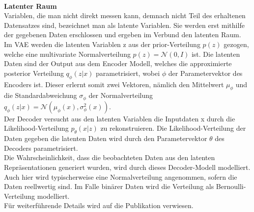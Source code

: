 \documentclass[%
thesis=student,%
coverpage=false,%
titlepage=false,%
headmarks=true, %
german,%
font=libertine, %
math=newpxtx, %
BCOR=5mm,%
coverBCOR=11mm%
]{tumbook}
\theoremstyle{break}
\begin{document}
\\
\textbf{Latenter Raum}\\
Variablen, die man nicht direkt messen kann, demnach nicht Teil des erhaltenen Datensatzes sind, bezeichnet man als latente Variablen. Sie werden erst mithilfe der gegebenen Daten erschlossen und ergeben im Verbund den latenten Raum.\\
Im VAE werden die latenten Variablen z aus der prior-Verteilung $p(z)$ gezogen, welche eine multivariate Normalverteilung $p(z) = \mathcal{N}(0,I) $ ist. Die latenten Daten sind der Output aus dem Encoder Modell, welches die  approximierte posterior Verteilung $q_\phi(z|x)$ parametrisiert, wobei $\phi$ der Parametervektor des Encoders ist. Dieser erlernt somit zwei Vektoren, nämlich den Mittelwert \( \mu_\phi \) und die Standardabweichung \( \sigma_\phi \) der Normalverteilung $q_\phi(z|x) = \mathcal{N}(\mu_\phi(x),\sigma_\phi^2(x))$.\\
Der Decoder versucht aus den latenten Variablen die Inputdaten x durch die Likelihood-Verteilung $p_\theta(x|z)$  zu rekonstruieren. Die Likelihood-Verteilung der Daten gegeben die latenten Daten wird durch den Parametervektor $\theta$ des Decoders parametrisiert.\\
Die  Wahrscheinlichkeit, dass die beobachteten Daten aus den latenten Repräsentationen generiert wurden, wird durch dieses Decoder-Modell modelliert. Auch hier wird typischerweise eine Normalverteilung angenommen, sofern die  Daten reellwertig sind. Im Falle binärer Daten wird die Verteilung als Bernoulli-Verteilung modelliert. \\ Für weiterführende Details wird auf die Publikation \cite{Auto-EncodingVariationalBayes} verwiesen.\\
\end{document}
